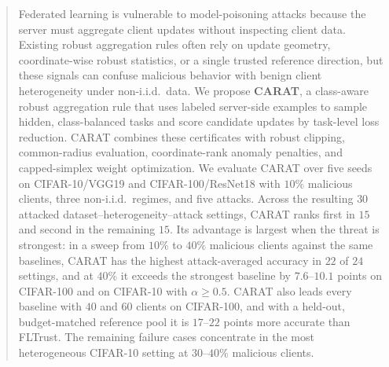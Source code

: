 \begin{abstract}
Federated learning is vulnerable to model-poisoning attacks because the server must aggregate client updates without inspecting client data. Existing robust aggregation rules often rely on update geometry, coordinate-wise robust statistics, or a single trusted reference direction, but these signals can confuse malicious behavior with benign client heterogeneity under non-i.i.d.\ data. We propose \textbf{CARAT}, a class-aware robust aggregation rule that uses labeled server-side examples to sample hidden, class-balanced tasks and score candidate updates by task-level loss reduction. CARAT combines these certificates with robust clipping, common-radius evaluation, coordinate-rank anomaly penalties, and capped-simplex weight optimization. We evaluate CARAT over five seeds on CIFAR-10/VGG19 and CIFAR-100/ResNet18 with $10\%$ malicious clients, three non-i.i.d.\ regimes, and five attacks. Across the resulting $30$ attacked dataset--heterogeneity--attack settings, CARAT ranks first in $15$ and second in the remaining $15$. Its advantage is largest when the threat is strongest: in a sweep from $10\%$ to $40\%$ malicious clients against the same baselines, CARAT has the highest attack-averaged accuracy in $22$ of $24$ settings, and at $40\%$ it exceeds the strongest baseline by $7.6$--$10.1$ points on CIFAR-100 and on CIFAR-10 with $\alpha\ge0.5$. CARAT also leads every baseline with $40$ and $60$ clients on CIFAR-100, and with a held-out, budget-matched reference pool it is $17$--$22$ points more accurate than FLTrust. The remaining failure cases concentrate in the most heterogeneous CIFAR-10 setting at $30$--$40\%$ malicious clients.
\end{abstract}
